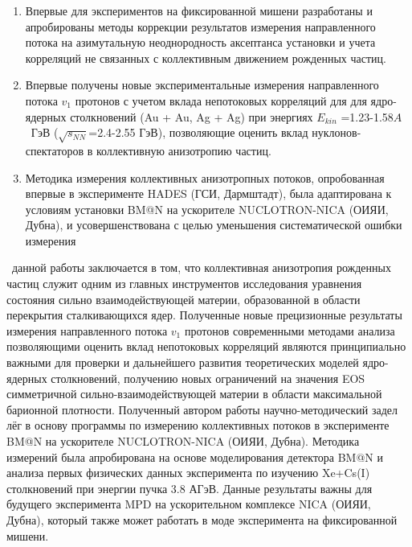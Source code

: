 \novelty
\begin{enumerate}
    \item Впервые для экспериментов на фиксированной мишени разработаны и апробированы методы коррекции результатов измерения направленного потока на азимутальную неоднородность аксептанса установки и учета корреляций не связанных с  коллективным движением рожденных частиц.

    \item Впервые получены новые экспериментальные измерения направленного потока $v_1$ протонов с учетом вклада непотоковых корреляций для для ядро-ядерных столкновений (Au + Au, Ag + Ag) при энергиях $E_{kin}$ =1.23-1.58$A$~ГэВ ($\sqrt{s_{NN}}$=2.4-2.55 ГэВ), позволяющие оценить вклад нуклонов-спектаторов в коллективную анизотропию частиц.

    \item Методика измерения коллективных анизотропных потоков, опробованная впервые в эксперименте HADES (ГСИ, Дармштадт), была адаптирована к условиям установки BM@N на ускорителе NUCLOTRON-NICA (ОИЯИ, Дубна), и усовершенствована с целью уменьшения систематической ошибки измерения
\end{enumerate}

\influence\ данной работы заключается в том, что коллективная анизотропия рожденных частиц служит одним из главных инструментов исследования уравнения состояния сильно взаимодействующей материи, образованной в области перекрытия сталкивающихся ядер.
Полученные новые прецизионные результаты измерения направленного потока $v_1$ протонов современными методами анализа позволяющими оценить вклад непотоковых корреляций являются принципиально важными для проверки и дальнейшего развития теоретических моделей ядро-ядерных столкновений, получению новых ограничений на значения EOS симметричной сильно-взаимодействующей материи в области максимальной барионной плотности.
Полученный автором работы научно-методический задел лёг в основу программы по измерению коллективных потоков в эксперименте BM@N на ускорителе NUCLOTRON-NICA (ОИЯИ, Дубна). 
Методика измерений была апробирована на основе моделирования детектора BM@N и анализа первых физических данных эксперимента по изучению Xe+Cs(I) столкновений при энергии пучка 3.8 АГэВ.  Данные результаты важны для будущего эксперимента MPD на ускорительном комплексе NICA (ОИЯИ, Дубна), который также может работать в моде эксперимента на фиксированной мишени.

